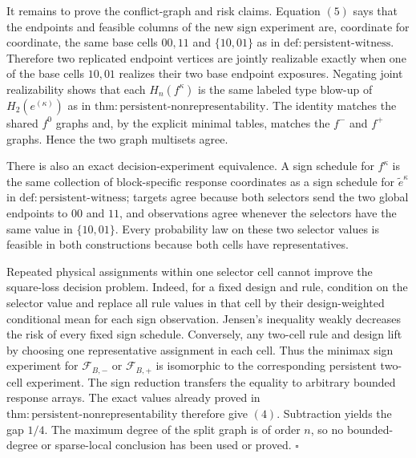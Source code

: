 It remains to prove the conflict-graph and risk claims. Equation \((5)\) says that the endpoints and feasible columns of the new sign experiment are, coordinate for coordinate, the same base cells \(00,11\) and \(\{10,01\}\) as in \(\mathrm{def{:}persistent\text{-}witness}\). Therefore two replicated endpoint vertices are jointly realizable exactly when one of the base cells \(10,01\) realizes their two base endpoint exposures. Negating joint realizability shows that each \(H_n(f^\kappa)\) is the same labeled type blow-up of \(H_2(e^{(\kappa)})\) as in \(\mathrm{thm{:}persistent\text{-}nonrepresentability}\). The identity matches the shared \(f^0\) graphs and, by the explicit minimal tables, matches the \(f^-\) and \(f^+\) graphs. Hence the two graph multisets agree.

There is also an exact decision-experiment equivalence. A sign schedule for \(f^\kappa\) is the same collection of block-specific response coordinates as a sign schedule for \(\widetilde e^\kappa\) in \(\mathrm{def{:}persistent\text{-}witness}\); targets agree because both selectors send the two global endpoints to \(00\) and \(11\), and observations agree whenever the selectors have the same value in \(\{10,01\}\). Every probability law on these two selector values is feasible in both constructions because both cells have representatives.

Repeated physical assignments within one selector cell cannot improve the square-loss decision problem. Indeed, for a fixed design and rule, condition on the selector value and replace all rule values in that cell by their design-weighted conditional mean for each sign observation. Jensen's inequality weakly decreases the risk of every fixed sign schedule. Conversely, any two-cell rule and design lift by choosing one representative assignment in each cell. Thus the minimax sign experiment for \(\mathcal F_{B,-}\) or \(\mathcal F_{B,+}\) is isomorphic to the corresponding persistent two-cell experiment. The sign reduction transfers the equality to arbitrary bounded response arrays. The exact values already proved in \(\mathrm{thm{:}persistent\text{-}nonrepresentability}\) therefore give \((4)\). Subtraction yields the gap \(1/4\). The maximum degree of the split graph is of order \(n\), so no bounded-degree or sparse-local conclusion has been used or proved. \(\square\)